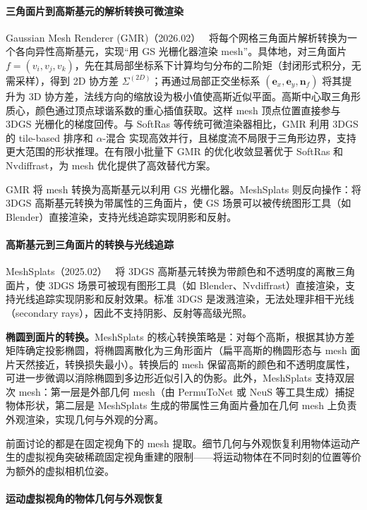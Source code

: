 \paragraph{三角面片到高斯基元的解析转换可微渲染}

Gaussian Mesh Renderer (GMR)（2026.02）~\cite{2602_14493} 将每个网格三角面片解析转换为一个各向异性高斯基元，实现“用 GS 光栅化器渲染 mesh”。具体地，对三角面片 $f=(v_i, v_j, v_k)$，先在其局部坐标系下计算均匀分布的二阶矩（封闭形式积分，无需采样），得到 2D 协方差 $\Sigma^{(2D)}$；再通过局部正交坐标系 $(\mathbf{e}_x, \mathbf{e}_y, \mathbf{n}_f)$ 将其提升为 3D 协方差，法线方向的缩放设为极小值使高斯近似平面。高斯中心取三角形质心，颜色通过顶点球谐系数的重心插值获取。这样 mesh 顶点位置直接参与 3DGS 光栅化的梯度回传。与 SoftRas 等传统可微渲染器相比，GMR 利用 3DGS 的 tile-based 排序和 $\alpha$-混合 实现高效并行，且梯度流不局限于三角形边界，支持更大范围的形状推理。在有限小批量下 GMR 的优化收敛显著优于 SoftRas 和 Nvdiffrast，为 mesh 优化提供了高效替代方案。

GMR 将 mesh 转换为高斯基元以利用 GS 光栅化器。MeshSplats 则反向操作：将 3DGS 高斯基元转换为带属性的三角面片，使 GS 场景可以被传统图形工具（如 Blender）直接渲染，支持光线追踪实现阴影和反射。

\paragraph{高斯基元到三角面片的转换与光线追踪}

MeshSplats（2025.02）~\cite{2502_07754} 将 3DGS 高斯基元转换为带颜色和不透明度的离散三角面片，使 3DGS 场景可被现有图形工具（如 Blender、Nvdiffrast）直接渲染，支持光线追踪实现阴影和反射效果。标准 3DGS 是泼溅渲染，无法处理非相干光线（secondary rays），因此不支持阴影、反射等高级光照。

\textbf{椭圆到面片的转换。}MeshSplats 的核心转换策略是：对每个高斯，根据其协方差矩阵确定投影椭圆，将椭圆离散化为三角形面片（扁平高斯的椭圆形态与 mesh 面片天然接近，转换损失最小）。转换后的 mesh 保留高斯的颜色和不透明度属性，可进一步微调以消除椭圆到多边形近似引入的伪影。此外，MeshSplats 支持双层次 mesh：第一层是外部几何 mesh（由 PermuToNet 或 NeuS 等工具生成）捕捉物体形状，第二层是 MeshSplats 生成的带属性三角面片叠加在几何 mesh 上负责外观渲染，实现几何与外观的分离。

前面讨论的都是在固定视角下的 mesh 提取。细节几何与外观恢复利用物体运动产生的虚拟视角突破稀疏固定视角重建的限制——将运动物体在不同时刻的位置等价为额外的虚拟相机位姿。

\paragraph{运动虚拟视角的物体几何与外观恢复}

